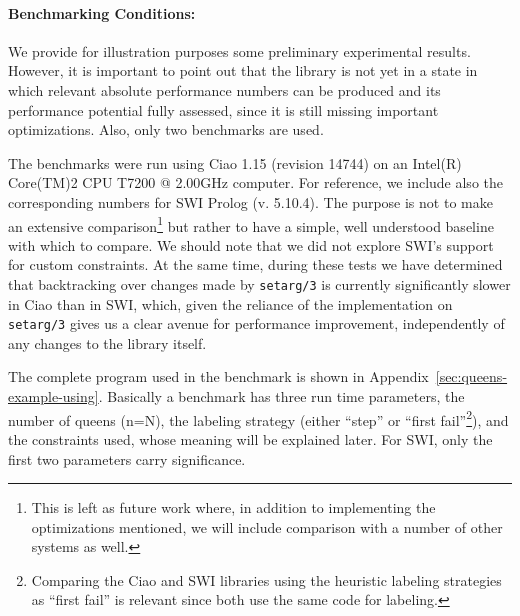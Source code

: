 \documentclass{llncs}
\begin{document}
\paragraph{Benchmarking Conditions:} We provide for illustration
purposes some preliminary experimental results. However, it is
important to point out that the library is not yet in a state in which
relevant absolute performance numbers can be produced and its
performance potential fully assessed, since it is still missing
important optimizations. Also, only two benchmarks are used.

The benchmarks were run using Ciao 1.15 (revision 14744) on an
Intel(R) Core(TM)2 CPU T7200 @ 2.00GHz computer. For reference, we
include also the corresponding numbers for SWI Prolog (v. 5.10.4). The
purpose is not to make an extensive comparison\footnote{This is left
  as future work where, in addition to implementing the optimizations
  mentioned, we will include comparison with a number of other systems
  as well.} but rather to have a simple, well understood baseline with
which to compare. 
We should note that we did not explore SWI's support
for custom constraints.  At the same time, during these tests we have
determined that backtracking over changes made by \verb!setarg/3! is
currently significantly slower in Ciao than in SWI, which, given the
reliance of the implementation on \verb!setarg/3!  gives us a clear
avenue for performance improvement, independently of any changes to
the library itself.


The complete program used in the benchmark is shown in
Appendix~\ref{sec:queens-example-using}. Basically a benchmark has
three run time parameters, the number of queens (n=N), the labeling
strategy (either ``step'' or ``first fail''\footnote{Comparing the Ciao
  and SWI libraries using the heuristic labeling strategies as ``first
  fail'' is relevant since both use the same code for labeling.}), and
the constraints used, whose meaning will be explained later. For SWI,
only the first two parameters carry significance.
\end{document}
